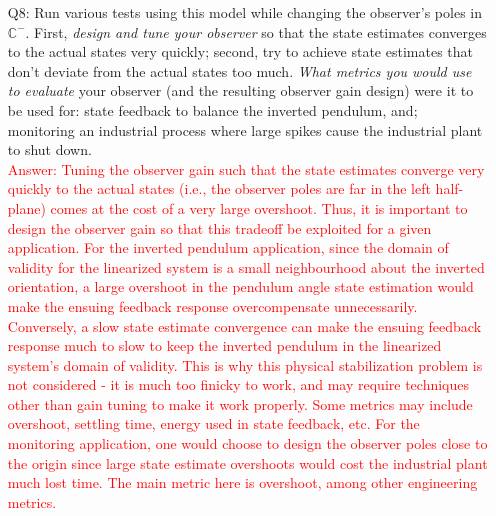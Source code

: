 \documentclass[12pt]{report}
\newcommand\drew[1]{\textcolor{red}{#1}}
\begin{document}
\begin{enumerate}
    \item[Q8:] Run various tests using this model while changing the observer's poles in $\mathbb{C}^-$. First, \emph{design and tune your observer} so that the state estimates converges to the actual states very quickly; second, try to achieve state estimates that don't deviate from the actual states too much. \emph{What metrics you would use to evaluate} your observer (and the resulting observer gain design) were it to be used for: state feedback to balance the inverted pendulum, and; monitoring an industrial process where large spikes cause the industrial plant to shut down.\\
          \drew{Answer: Tuning the observer gain such that the state estimates converge very quickly to the actual states (i.e., the observer poles are far in the left half-plane) comes at the cost of a very large overshoot. Thus, it is important to design the observer gain so that this tradeoff be exploited for a given application. For the inverted pendulum application, since the domain of validity for the linearized system is a small neighbourhood about the inverted orientation, a large overshoot in the pendulum angle state estimation would make the ensuing feedback response overcompensate unnecessarily. Conversely, a slow state estimate convergence can make the ensuing feedback response much to slow to keep the inverted pendulum in the linearized system's domain of validity. This is why this physical stabilization problem is not considered - it is much too finicky to work, and may require techniques other than gain tuning to make it work properly. Some metrics may include overshoot, settling time, energy used in state feedback, etc. For the monitoring application, one would choose to design the observer poles close to the origin since large state estimate overshoots would cost the industrial plant much lost time. The main metric here is overshoot, among other engineering metrics.}
\end{enumerate}
\end{document}
